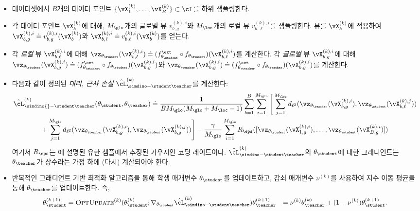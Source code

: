 \documentclass[../../book-main_ko.tex]{subfiles}
\begin{document}
\begin{itemize}
    \item 데이터셋에서 \(B\)개의 데이터 포인트 \(\{\vX_{1}^{(k)}, \dots, \vX_{B}^{(k)}\} \subset \cI\)를 하위 샘플링한다.
    \item 각 데이터 포인트 \(\vX_{b}^{(k)}\)에 대해, \(M_{\glo}\)개의 글로벌 뷰 \(v_{b, g}^{(k), i}\)와 \(M_{\loc}\)개의 로컬 뷰 \(v_{b, \ell}^{(k), i}\)를 샘플링한다. 뷰를 \(\vX_{b}^{(k)}\)에 적용하여 \(\vX_{b, g}^{(k), i} \doteq v_{b, g}^{(k), i}(\vX_{b}^{(k)})\)와 \(\vX_{b, \ell}^{(k), i} \doteq v_{b, \ell}^{(k), i}(\vX_{b}^{(k)})\)를 얻는다.
    \item 각 \textit{로컬} 뷰 \(\vX_{b, \ell}^{(k), i}\)에 대해 \(\vz_{\theta_{\student}}(\vX_{b, \ell}^{(k), i}) \doteq (f_{\theta_{\student}}^{\ext} \circ f_{\theta_{\student}})(\vX_{b, \ell}^{(k), i})\)를 계산한다. 각 \textit{글로벌} 뷰 \(\vX_{b, g}^{(k), i}\)에 대해 \(\vz_{\theta_{\student}}(\vX_{b, g}^{(k), i}) \doteq (f_{\theta_{\student}}^{\ext} \circ f_{\theta_{\student}})(\vX_{b, g}^{(k), i})\)와 \(\vz_{\theta_{\teacher}}(\vX_{b, g}^{(k), i}) \doteq (f_{\theta_{\teacher}}^{\ext} \circ f_{\theta_{\teacher}})(\vX_{b, g}^{(k), i})\)를 계산한다.
    \item 다음과 같이 정의된 \textit{대리, 근사 손실} \(\hat{\cL}_{\simdino-\student\teacher}^{(k)}\)를 계산한다:
    \begin{align}\label{eq:simdino_loss_teacherstudent_empirical}
        &\hat{\cL}_{\simdino{}-\student\teacher}^{(k)}(\theta_{\student}, \theta_{\teacher}) \doteq
        \frac{1}{BM_{\glo}(M_{\glo} + M_{\loc} - 1)}\sum_{b = 1}^{B}\sum_{i = 1}^{M_{\glo}}\Bigg[\sum_{j = 1}^{M_{\loc}}d_{\ell^{2}}(\vz_{\theta_{\teacher}}(\vX_{b, g}^{(k), i}), \vz_{\theta_{\student}}(\vX_{b, \ell}^{(k), j})) \\
        &\qquad \qquad + \sum_{j = 1}^{M_{\glo}}d_{\ell^{2}}(\vz_{\theta_{\teacher}}(\vX_{b, g}^{(k), i}), \vz_{\theta_{\student}}(\vX_{b, g}^{(k), j}))\Bigg] - \frac{\gamma}{M_{\glo}}\sum_{i = 1}^{M_{\glo}}R_{\eps}( [\vz_{\theta_{\student}}(\vX_{1, g}^{(k), i}), \dots, \vz_{\theta_{\student}}(\vX_{B, g}^{(k), i})])
    \end{align}
    여기서 \(R_{\eps}\)는 에 설명된 유한 샘플에서 추정된 가우시안 코딩 레이트이다. \(\hat{\cL}_{\simdino-\student\teacher}^{(k)}\)의 \(\theta_{\student}\)에 대한 그래디언트는 \(\theta_{\teacher}\)가 상수라는 가정 하에 (다시) 계산되어야 한다.
    \item 반복적인 그래디언트 기반 최적화 알고리즘을 통해 학생 매개변수 \(\theta_{\student}\)를 업데이트하고, 감쇠 매개변수 \(\nu^{(k)}\)를 사용하여 지수 이동 평균을 통해 \(\theta_{\teacher}\)를 업데이트한다. 즉,
    \begin{align}
        \theta_{\student}^{(k + 1)}
        &= \textsc{OptUpdate}^{(k)}(\theta_{\student}^{(k)}; \nabla_{\theta_{\student}}\hat{\cL}_{\simdino-\student\teacher}^{(k)})
        \theta_{\teacher}^{(k + 1)}
        &= \nu^{(k)}\theta_{\teacher}^{(k)} + (1 - \nu^{(k)})\theta_{\student}^{(k + 1)}.
    \end{align}
\end{itemize}
\end{document}
